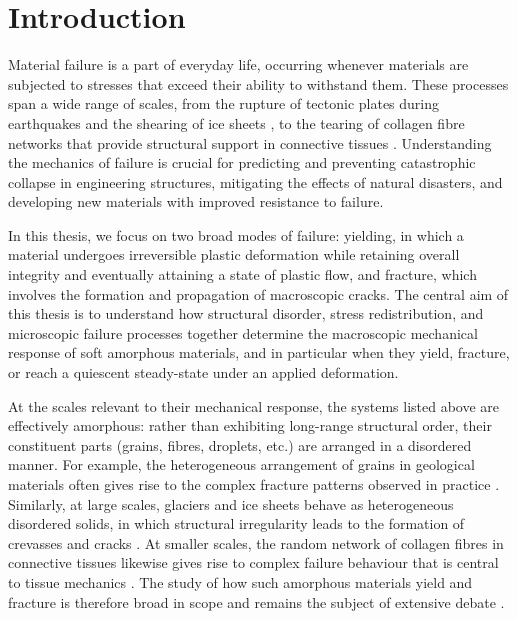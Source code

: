 
\setcounter{equation}{0}
\chapter{Introduction}

Material failure is a part of everyday life, occurring whenever materials are subjected to stresses that exceed their ability to withstand them. These processes span a wide range of scales, from the rupture of tectonic plates during earthquakes \cite{Cocco2023} and the shearing of ice sheets \cite{Jennings2021}, to the tearing of collagen fibre networks that provide structural support in connective tissues \cite{Burla2020}. Understanding the mechanics of failure is crucial for predicting and preventing catastrophic collapse in engineering structures, mitigating the effects of natural disasters, and developing new materials with improved resistance to failure.

In this thesis, we focus on two broad modes of failure: yielding, in which a material undergoes irreversible plastic deformation while retaining overall integrity and eventually attaining a state of plastic flow, and fracture, which involves the formation and propagation of macroscopic cracks. The central aim of this thesis is to understand how structural disorder, stress redistribution, and microscopic failure processes together determine the macroscopic mechanical response of soft amorphous materials, and in particular when they yield, fracture, or reach a quiescent steady-state under an applied deformation.

At the scales relevant to their mechanical response, the systems listed above are effectively amorphous: rather than exhibiting long-range structural order, their constituent parts (grains, fibres, droplets, etc.) are arranged in a disordered manner.
For example, the heterogeneous arrangement of grains in geological materials often gives rise to the complex fracture patterns observed in practice \cite{Cocco2023}. Similarly, at large scales, glaciers and ice sheets behave as heterogeneous disordered solids, in which structural irregularity leads to the formation of crevasses and cracks \cite{Jennings2021}. At smaller scales, the random network of collagen fibres in connective tissues likewise gives rise to complex failure behaviour that is central to tissue mechanics \cite{Burla2020,ruiz-franco_force_2022}. The study of how such amorphous materials yield and fracture is therefore broad in scope and remains the subject of extensive debate \cite{falk_deformation_2011,nicolas_deformation_2018,larson_structure_1999,bonn_yield_2017}.

